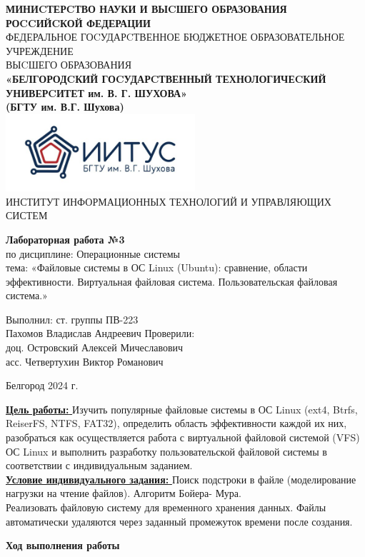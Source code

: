 \documentclass[a4paper,14pt]{extarticle}
\newcommand\textbox[1]{
	\parbox{.45\textwidth}{#1}
}
\begin{document}
\begin{center}
    \small{
        \textbf{МИНИCТЕРCТВО НАУКИ И ВЫCШЕГО ОБРАЗОВАНИЯ РОCCИЙCКОЙ ФЕДЕРАЦИИ}\\
        ФЕДЕРАЛЬНОЕ ГОCУДАРCТВЕННОЕ БЮДЖЕТНОЕ ОБРАЗОВАТЕЛЬНОЕ УЧРЕЖДЕНИЕ\\ВЫCШЕГО ОБРАЗОВАНИЯ \\
        \textbf{«БЕЛГОРОДCКИЙ ГОCУДАРCТВЕННЫЙ ТЕХНОЛОГИЧЕCКИЙ\\УНИВЕРCИТЕТ им. В. Г. ШУХОВА»\\ (БГТУ им. В.Г. Шухова)} \\
        \bigbreak
        \includegraphics[width=70mm]{log}\\
        ИНСТИТУТ ИНФОРМАЦИОННЫХ ТЕХНОЛОГИЙ И УПРАВЛЯЮЩИХ СИСТЕМ\\}
\end{center}

\vfill
\begin{center}
    \large{
        \textbf{
            Лабораторная работа №3}}\\
    \normalsize{
        по дисциплине: Операционные системы \\
        тема: «Файловые системы в ОС Linux (Ubuntu): сравнение, области эффективности. Виртуальная файловая система. Пользовательская файловая система.»}
\end{center}
\vfill
\hfill\textbox{
    Выполнил: ст. группы ПВ-223\\Пахомов Владислав Андреевич
    \bigbreak
    Проверили: \\доц. Островский Алексей Мичеславович\\
    асс. Четвертухин Виктор Романович
}
\vfill\begin{center}
    Белгород 2024 г.
\end{center}
\newpage
\underline{\textbf{Цель работы: }}Изучить популярные файловые системы в ОС Linux (ext4, Btrfs, ReiserFS, NTFS,
FAT32), определить область эффективности каждой их них, разобраться как осуществляется
работа с виртуальной файловой системой (VFS) ОС Linux и выполнить разработку
пользовательской файловой системы в соответствии с индивидуальным заданием.\\
\underline{\textbf{Условие индивидуального задания: }}Поиск подстроки в файле (моделирование нагрузки на чтение файлов). Алгоритм Бойера-
Мура.\\
Реализовать файловую систему для временного хранения данных. Файлы автоматически
удаляются через заданный промежуток времени после создания.\\
\begin{center}
\textbf{Ход выполнения работы}
\end{center}
\end{document}
